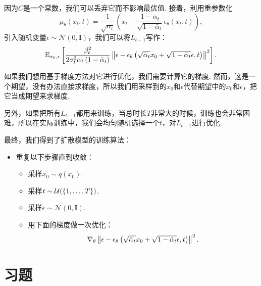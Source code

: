 因为$C$是一个常数，我们可以丢弃它而不影响最优值. 接着，利用重参数化
\[
\mu_{\theta}(x_t, t) =  \frac{1}{\sqrt{\alpha_t}} \left( x_t - \frac{1-\alpha_t}{\sqrt{1 - \bar{\alpha}_t}}\epsilon_{\theta}(x_t, t) \right),
\]
引入随机变量$\epsilon\sim\mathcal{N}(0,\mathbf{I})$，我们可以将$L_{t-1}$写作：
\[
\mathbb{E}_{x_0, \epsilon}\left[\frac{\beta_t^2}{2 \sigma_t^2 \alpha_t\left(1-\bar{\alpha}_t\right)}\left\|\epsilon-\epsilon_\theta\left(\sqrt{\bar{\alpha}_t} x_0+\sqrt{1-\bar{\alpha}_t} \epsilon, t\right)\right\|^2\right].
\]

如果我们想用基于梯度方法对它进行优化，我们需要计算它的梯度. 然而，这是一个期望，没有办法直接求梯度，所以我们用采样到的$x_0$和$\epsilon$代替期望中的$x_0$和$\epsilon$，把它当成期望来求梯度. 

另外，如果把所有$L_{t-1}$都用来训练，当总时长$T$非常大的时候，训练也会非常困难，所以在实际训练中，我们会均匀随机选择一个$t$，对$L_{t-1}$进行优化. 

最终，我们得到了扩散模型的训练算法：

\begin{itemize}
    \item 重复以下步骤直到收敛：
    \begin{itemize}
        \item 采样$x_0 \sim q\left(x_0\right)$.
        \item 采样$t \sim \mathcal{U}(\{1, \ldots, T\})$.
        \item 采样$\epsilon \sim \mathcal{N}(0, \mathbf{I})$.
        \item 用下面的梯度做一次优化：
        \[
        \nabla_\theta\left\|\epsilon-\epsilon_\theta\left(\sqrt{\bar{\alpha}_t} x_0+\sqrt{1-\bar{\alpha}_t} \epsilon, t\right)\right\|^2.
        \]
    \end{itemize}
\end{itemize}


\section{习题}

